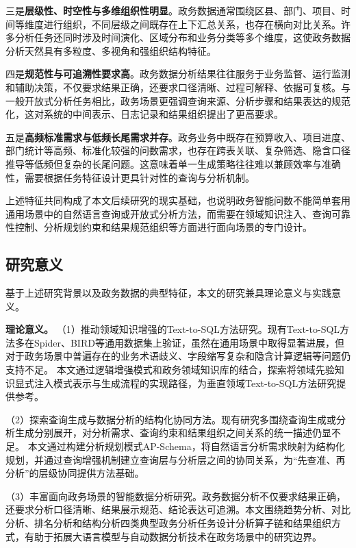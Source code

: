 三是\textbf{层级性、时空性与多维组织性明显}。政务数据通常围绕区县、部门、项目、时间等维度进行组织，不同层级之间既存在上下汇总关系，也存在横向对比关系。许多分析任务还同时涉及时间演化、区域分布和业务分类等多个维度，这使政务数据分析天然具有多粒度、多视角和强组织结构特征。

四是\textbf{规范性与可追溯性要求高}。政务数据分析结果往往服务于业务监督、运行监测和辅助决策，不仅要求结果正确，还要求口径清晰、过程可解释、依据可复核。与一般开放式分析任务相比，政务场景更强调查询来源、分析步骤和结果表达的规范化，这对系统的中间表示、日志记录和结果组织提出了更高要求。

五是\textbf{高频标准需求与低频长尾需求并存}。政务业务中既存在预算收入、项目进度、部门统计等高频、标准化较强的问数需求，也存在跨表关联、复杂筛选、隐含口径推导等低频但复杂的长尾问题。这意味着单一生成策略往往难以兼顾效率与准确性，需要根据任务特征设计更具针对性的查询与分析机制。

上述特征共同构成了本文后续研究的现实基础，也说明政务智能问数不能简单套用通用场景中的自然语言查询或开放式分析方法，而需要在领域知识注入、查询可靠性控制、分析规划约束和结果规范组织等方面进行面向场景的专门设计。

\subsection{研究意义}

基于上述研究背景以及政务数据的典型特征，本文的研究兼具理论意义与实践意义。

\textbf{理论意义。}
（1）推动领域知识增强的Text-to-SQL方法研究。现有Text-to-SQL方法多在Spider\cite{zeng2018spider}、BIRD\cite{liu2025bird}等通用数据集上验证，虽然在通用场景中取得显著进展，但对于政务场景中普遍存在的业务术语歧义、字段缩写复杂和隐含计算逻辑等问题仍支持不足\cite{王昊奋2024}。
本文通过逻辑增强模式和政务领域知识库的结合，探索将领域先验知识显式注入模式表示与生成流程的实现路径，为垂直领域Text-to-SQL方法研究提供参考。

（2）探索查询生成与数据分析的结构化协同方法。现有研究多围绕查询生成或分析生成分别展开，对分析需求、查询约束和结果组织之间关系的统一描述仍显不足。
本文通过构建分析规划模式AP-Schema，将自然语言分析需求映射为结构化规划，并通过查询增强机制建立查询层与分析层之间的协同关系，为“先查准、再分析”的层级协同提供方法基础。

（3）丰富面向政务场景的智能数据分析研究。政务数据分析不仅要求结果正确，还要求分析口径清晰、结果展示规范、结论表达可追溯。本文围绕趋势分析、对比分析、排名分析和结构分析四类典型政务分析任务设计分析算子链和结果组织方式，有助于拓展大语言模型与自动数据分析技术在政务场景中的研究边界\cite{hong2024datainterpreter,ma2023insightpilot}。

